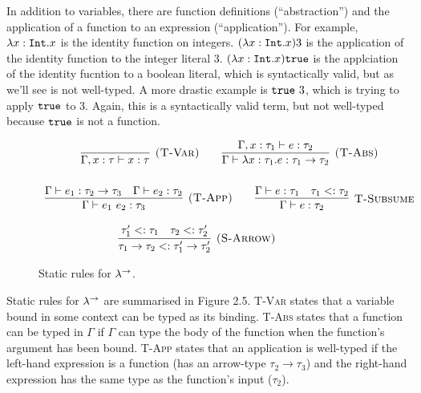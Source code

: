 In addition to variables, there are function definitions (``abstraction'') and the application of a function to an expression (``application''). For example, $\lambda x: \mathtt{Int} . x$ is the identity function on integers. $(\lambda x: \mathtt{Int} . x) 3$ is the application of the identity function to the integer literal $3$. $(\lambda x: \mathtt{Int} . x) \mathtt{true}$ is the applciation of the identity fucntion to a boolean literal, which is syntactically valid, but as we'll see is not well-typed. A more drastic example is $\mathtt{true}~3$, which is trying to apply $\mathtt{true}$ to $3$. Again, this is a syntactically valid term, but not well-typed because $\mathtt{true}$ is not a function.\\





\begin{figure}[h]


\[
\begin{array}{c}


\infer[\textsc{(T-Var)}]
	{\Gamma, x: \tau \vdash x: \tau}
	{}
	
~~~~~~
	
\infer[\textsc{(T-Abs)}]
	{\Gamma \vdash \lambda x: \tau_1.e : \tau_1 \rightarrow \tau_2}
	{\Gamma, x: \tau_1 \vdash e: \tau_2} \\[4ex]
	
	
\infer[\textsc{(T-App)}]
	{\Gamma \vdash e_1~e_2: \tau_3}
	{\Gamma \vdash e_1: \tau_2 \rightarrow \tau_3 & \Gamma \vdash e_2: \tau_2}
	~~~~~~
\infer[\textsc{T-Subsume}]
	{\Gamma \vdash e: \tau_2}
	{\Gamma \vdash e: \tau_1 & \tau_1 <: \tau_2 }

\end{array}
\]

	
\fbox{$\tau <: \tau$}

	
\[
\begin{array}{c}


\infer[\textsc{(S-Arrow)}]
	{\tau_1 \rightarrow \tau_2 <: \tau_1' \rightarrow \tau_2'}
	{\tau_1' <: \tau_1 & \tau_2 <: \tau_2'}

~~~~~~

\end{array}
\]

\vspace{-7pt}
\caption{Static rules for $\lambda^{\rightarrow}$.}
\label{This is the label.}
\end{figure}

Static rules for $\lambda^{\rightarrow}$ are summarised in Figure 2.5. \textsc{T-Var} states that a variable bound in some context can be typed as its binding. \textsc{T-Abs} states that a function can be typed in $\Gamma$ if $\Gamma$ can type the body of the function when the function's argument has been bound. \textsc{T-App} states that an application is well-typed if the left-hand expression is a function (has an arrow-type $\tau_2 \rightarrow \tau_3$) and the right-hand expression has the same type as the function's input ($\tau_2$).

